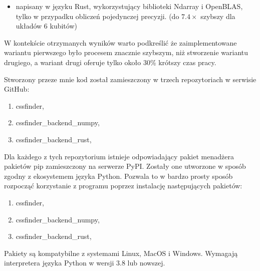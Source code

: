 \documentclass[11pt, a4paper]{article}
\begin{document}
\begin{sloppypar}
\begin{itemize}
      \item napisany w języku Rust, wykorzystujący biblioteki Ndarray i OpenBLAS, tylko w
        przypadku obliczeń pojedynczej precyzji. (do $7.4\times$ szybszy dla układów 6 kubitów)
    \end{itemize}
    W kontekście otrzymanych wyników warto podkreślić że zaimplementowane wariantu
    pierwszego było procesem znacznie szybszym, niż stworzenie wariantu drugiego, a
    wariant drugi oferuje tylko około 30\% krótszy czas pracy.

    Stworzony przeze mnie kod został zamieszczony w trzech repozytoriach w serwisie GitHub:
    \begin{enumerate}
      \item cssfinder\cite{CSSFinder_New},

      \item cssfinder\_backend\_numpy\cite{CSSFinder_New_Numpy},

      \item cssfinder\_backend\_rust\cite{CSSFinder_New_Rust},
    \end{enumerate}

    Dla każdego z tych repozytorium istnieje odpowiadający pakiet menadżera pakietów pip
    zamieszczony na serwerze PyPI. Zostały one utworzone w sposób zgodny z ekosystemem
    języka Python. Pozwala to w bardzo prosty sposób rozpocząć korzystanie z programu poprzez
    instalację następujących pakietów:
    \begin{enumerate}
      \item cssfinder\cite{CSSFinder_New_PyPI},

      \item cssfinder\_backend\_numpy\cite{CSSFinder_New_Numpy_PyPI},

      \item cssfinder\_backend\_rust\cite{CSSFinder_New_Rust_PyPI},
    \end{enumerate}

    Pakiety są kompatybilne z systemami Linux, MacOS i Windows. Wymagają interpretera języka
    Python w wersji 3.8 lub nowszej.
  \end{sloppypar}
  \newpage
  \begin{sloppypar}
    \medskip


    \printbibliography
    [heading=bibintoc, title={Odwołania}]
  \end{sloppypar}
\end{document}
